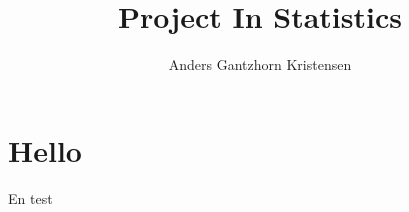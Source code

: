 \documentclass[11pt]{article}
\begin{document}
\pagestyle{fancy}
\fancyfoot{}
\fancyfoot[C]{\thepage}
\fancyhead[R]{\today}
\renewcommand{\headrulewidth}{0pt}
\renewcommand{\footrulewidth}{0pt}
\allowdisplaybreaks



\title{\vspace{-4cm}Project In Statistics}
\author{Anders Gantzhorn Kristensen}
\maketitle
\section{Hello}
En test\cite{texbook}

\end{document}
